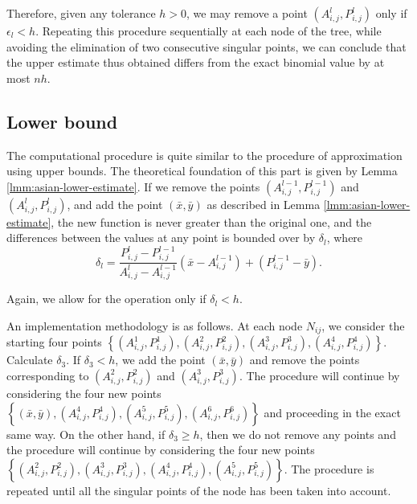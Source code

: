 Therefore, given any tolerance $ h > 0 $, we may remove a point $ \left( A_{i,j}^{l}, P_{i,j}^{l} \right) $ only if $ \epsilon_l < h $. Repeating this procedure sequentially at each node of the tree, while avoiding the elimination of two consecutive singular points, we can conclude that the upper estimate thus obtained differs from the exact binomial value by at most $ n h $.


\subsection{Lower bound}
\label{subsec:asian-lb}
The computational procedure is quite similar to the procedure of approximation using upper bounds. The theoretical foundation of this part is given by Lemma \ref{lmm:asian-lower-estimate}. If we remove the points $ \left( A_{i,j}^{l-1}, P_{i,j}^{l-1} \right) $ and $ \left( A_{i,j}^{l}, P_{i,j}^{l} \right) $, and add the point $ (\bar{x}, \bar{y} ) $ as described in Lemma \ref{lmm:asian-lower-estimate}, the new function is never greater than the original one, and the differences between the values at any point is bounded over by $ \delta_l $, where
\begin{equation}
	\delta_l  =  \frac{ P_{i,j}^{l} - P_{i,j}^{l-1} }{ A_{i,j}^{l} - A_{i,j}^{l-1} } \left( \bar{x} - A_{i,j}^{l-1} \right) + \left( P_{i,j}^{l-1} - \bar{y} \right) .
\end{equation}

Again, we allow for the operation only if $ \delta_l < h $.

An implementation methodology is as follows. At each node $ N_{ij} $, we consider the starting four points $ \left\lbrace  \left( A_{i,j}^1, P_{i,j}^1 \right), \left( A_{i,j}^2, P_{i,j}^2 \right), \left( A_{i,j}^3, P_{i,j}^3 \right), \left( A_{i,j}^4, P_{i,j}^4 \right)  \right\rbrace $. Calculate $ \delta_3 $. If $ \delta_3 < h $, we add the point $ (\bar{x}, \bar{y}) $ and remove the points corresponding to $ \left( A_{i,j}^2, P_{i,j}^2 \right) $ and $ \left( A_{i,j}^3, P_{i,j}^3 \right) $. The procedure will continue by considering the four new points $ \left\lbrace  (\bar{x}, \bar{y}), \left( A_{i,j}^4, P_{i,j}^4 \right), \left( A_{i,j}^5, P_{i,j}^5 \right), \left( A_{i,j}^6, P_{i,j}^6 \right)  \right\rbrace $ and proceeding in the exact same way. On the other hand, if $ \delta_3 \ge h $, then we do not remove any points and the procedure will continue by considering the four new points $ \left\lbrace  \left( A_{i,j}^2, P_{i,j}^2 \right), \left( A_{i,j}^3, P_{i,j}^3 \right), \left( A_{i,j}^4, P_{i,j}^4 \right), \left( A_{i,j}^5, P_{i,j}^5 \right)  \right\rbrace $. The procedure is repeated until all the singular points of the node has been taken into account.

